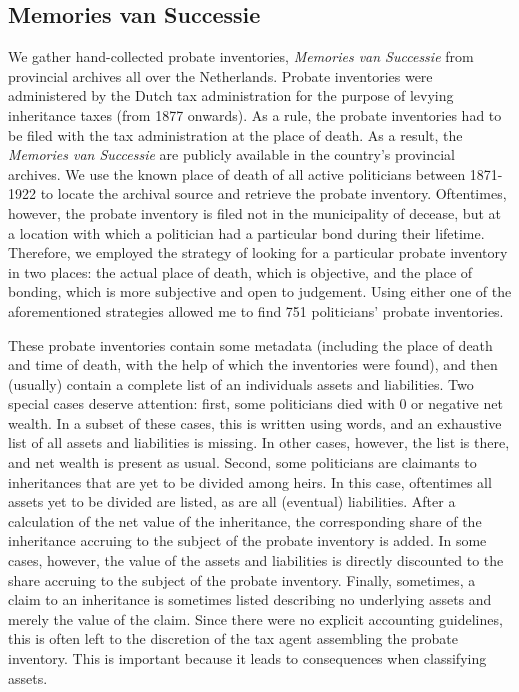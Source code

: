 \subsection{Memories van Successie}
    We gather hand-collected probate inventories, \textit{Memories van Successie} from provincial archives all over the Netherlands. Probate inventories were administered by the Dutch tax administration for the purpose of levying inheritance taxes (from 1877 onwards). \autocite{bos1989memories} As a rule, the probate inventories had to be filed with the tax administration at the place of death. As a result, the \textit{Memories van Successie} are publicly available in the country's provincial archives. We use the known place of death of all active politicians between 1871-1922 to locate the archival source and retrieve the probate inventory. Oftentimes, however, the probate inventory is filed not in the municipality of decease, but at a location with which a politician had a particular bond during their lifetime. Therefore, we employed the strategy of looking for a particular probate inventory in two places: the actual place of death, which is objective, and the place of bonding, which is more subjective and open to judgement. Using either one of the aforementioned strategies allowed me to find 751 politicians' probate inventories. 

    These probate inventories contain some metadata (including the place of death and time of death, with the help of which the inventories were found), and then (usually) contain a complete list of an individuals assets and liabilities. Two special cases deserve attention: first, some politicians died with 0 or negative net wealth. In a subset of these cases, this is written using words, and an exhaustive list of all assets and liabilities is missing. In other cases, however, the list is there, and net wealth is present as usual. Second, some politicians are claimants to inheritances that are yet to be divided among heirs. In this case, oftentimes all assets yet to be divided are listed, as are all (eventual) liabilities. After a calculation of the net value of the inheritance, the corresponding share of the inheritance accruing to the subject of the probate inventory is added. In some cases, however, the value of the assets and liabilities is directly discounted to the share accruing to the subject of the probate inventory. Finally, sometimes, a claim to an inheritance is sometimes listed describing no underlying assets and merely the value of the claim. Since there were no explicit accounting guidelines, this is often left to the discretion of the tax agent assembling the probate inventory. This is important because it leads to consequences when classifying assets. 

